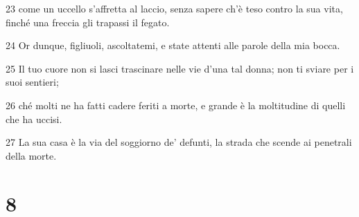 \par 23 come un uccello s'affretta al laccio, senza sapere ch'è teso contro la sua vita, finché una freccia gli trapassi il fegato.
\par 24 Or dunque, figliuoli, ascoltatemi, e state attenti alle parole della mia bocca.
\par 25 Il tuo cuore non si lasci trascinare nelle vie d'una tal donna; non ti sviare per i suoi sentieri;
\par 26 ché molti ne ha fatti cadere feriti a morte, e grande è la moltitudine di quelli che ha uccisi.
\par 27 La sua casa è la via del soggiorno de' defunti, la strada che scende ai penetrali della morte.

\chapter{8}

